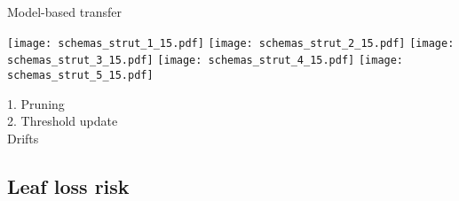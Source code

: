 \begin{frame}{Model-based transfer}
\begin{minipage}[t]{0.49\linewidth}
    \renewcommand{\ratio}{0.55}
    \begin{overprint}
        \centering\texttt{[image: schemas\_strut\_1\_15.pdf]}
        \centering\texttt{[image: schemas\_strut\_2\_15.pdf]}
        \centering\texttt{[image: schemas\_strut\_3\_15.pdf]}
        \centering\texttt{[image: schemas\_strut\_4\_15.pdf]}
        \centering\texttt{[image: schemas\_strut\_5\_15.pdf]}
    \end{overprint}
    \textcolor{myorange}{1. Pruning}\\
    \textcolor{myblue}{2. Threshold update}\\
    \bigskip
    Drifts
\end{minipage}

\end{frame}

\subsection{Leaf loss risk}

